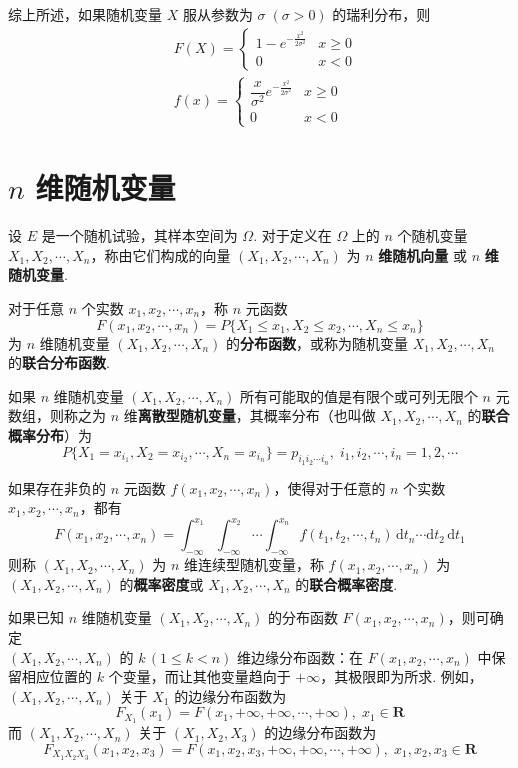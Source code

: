 综上所述，如果随机变量 $X$ 服从参数为 $\sigma \; (\sigma > 0)$ 的瑞利分布，则
$$
\begin{aligned}
    & F(X) = \begin{cases}
        1 - e^{-\frac{x^2}{2 \sigma^2}} & x \geqslant 0 \\
        0 & x<0
    \end{cases} \\[0.5em]
    & f(x) = \begin{cases}
        \dfrac{x}{\sigma^2} e^{-\frac{x^2}{2 \sigma^2}} & x \geqslant 0 \\[0.5em]
        0 & x<0
    \end{cases}
\end{aligned}
$$

\section{$n$ 维随机变量}

设 $E$ 是一个随机试验，其样本空间为 $\varOmega$. 对于定义在 $\varOmega$ 上的 $n$ 个随机变量 $X_1,X_2,\cdots,X_n$，称由它们构成的向量 $(X_1,X_2,\cdots,X_n)$ 为 $n$ \textbf{维随机向量} 或 $n$ \textbf{维随机变量}.

对于任意 $n$ 个实数 $x_1,x_2,\cdots,x_n$，称 $n$ 元函数
$$
F(x_1,x_2,\cdots,x_n) = P\{X_1 \leqslant x_1, X_2 \leqslant x_2, \cdots, X_n \leqslant x_n\}
$$
为 $n$ 维随机变量 $(X_1,X_2,\cdots,X_n)$ 的\textbf{分布函数}，或称为随机变量 $X_1,X_2,\cdots,X_n$ 的\textbf{联合分布函数}.

如果 $n$ 维随机变量 $(X_1,X_2,\cdots,X_n)$ 所有可能取的值是有限个或可列无限个 $n$ 元数组，则称之为 $n$ 维\textbf{离散型随机变量}，其概率分布（也叫做 $X_1,X_2,\cdots,X_n$ 的\textbf{联合概率分布}）为
$$
P\{X_1 = x_{i_1}, X_2 = x_{i_2}, \cdots, X_n = x_{i_n}\} = p_{i_1 i_2 \cdots i_n}, \; i_1, i_2, \cdots, i_n = 1,2,\cdots
$$

如果存在非负的 $n$ 元函数 $f(x_1,x_2,\cdots,x_n)$，使得对于任意的 $n$ 个实数 $x_1,x_2,\cdots,x_n$，都有
$$
F(x_1,x_2,\cdots,x_n) = \int_{-\infty}^{x_1} \int_{-\infty}^{x_2} \cdots \int_{-\infty}^{x_n} f(t_1,t_2,\cdots,t_n) \, \text{d}t_n \cdots \text{d}t_2 \, \text{d}t_1
$$
则称 $(X_1,X_2,\cdots,X_n)$ 为 $n$ 维连续型随机变量，称 $f(x_1,x_2,\cdots,x_n)$ 为 $(X_1,X_2,\cdots,X_n)$ 的\textbf{概率密度}或 $X_1,X_2,\cdots,X_n$ 的\textbf{联合概率密度}.

如果已知 $n$ 维随机变量 $(X_1,X_2,\cdots,X_n)$ 的分布函数 $F(x_1,x_2,\cdots,x_n)$，则可确定 \\
$(X_1,X_2,\cdots,X_n)$ 的 $k \, (1 \leqslant k < n)$ 维边缘分布函数：在 $F(x_1,x_2,\cdots,x_n)$ 中保留相应位置的 $k$ 个变量，而让其他变量趋向于 $+\infty$，其极限即为所求. 例如，$(X_1,X_2,\cdots,X_n)$ 关于 $X_1$ 的边缘分布函数为
$$
F_{X_1}(x_1) = F(x_1, +\infty, +\infty, \cdots, +\infty), \; x_1 \in \mathbf{R}
$$
而 $(X_1,X_2,\cdots,X_n)$ 关于 $(X_1,X_2,X_3)$ 的边缘分布函数为
$$
F_{X_1 X_2 X_3}(x_1,x_2,x_3) = F(x_1, x_2, x_3, +\infty, +\infty, \cdots, +\infty), \; x_1,x_2,x_3 \in \mathbf{R}
$$

